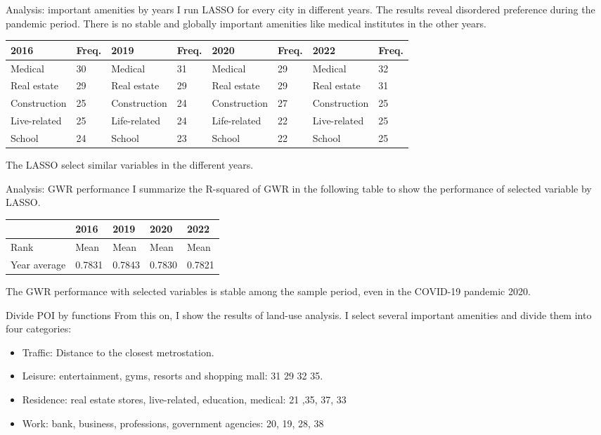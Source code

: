 \documentclass[aspectratio=169,xcolor=dvipsnames]{beamer}
\begin{document}
\begin{frame}{Analysis: important amenities by years}
	I run LASSO for every city in different years.
	The results reveal disordered preference during the pandemic period. There is no stable and globally important amenities like medical institutes in the other years.
	\begin{table}[]\small 
		\begin{tabular}{llllllll}\toprule
			2016         & Freq. & 2019         & Freq. & 2020 & Freq. & 2022         & Freq. \\\hline 
			Medical      & 30        & Medical      & 31        & Medical   & 29        & Medical      & 32        \\
			Real estate  & 29        & Real estate & 29        & Real estate    & 29        & Real estate  & 31        \\
			Construction & 25        & Construction & 24        & Construction   & 27        & Construction & 25        \\
			Live-related & 25        & Life-related  & 24        & Life-related   & 22         & Live-related & 25        \\
			School       & 24        & School       & 23        & School    & 22         & School       & 25       \\\bottomrule
		\end{tabular}
	\end{table}
The LASSO select similar variables in the different years.
\end{frame}
\begin{frame}{Analysis: GWR performance}
	I summarize the R-squared of GWR in the following table to show the performance of selected variable by LASSO.
	\begin{table}[]
		\begin{tabular}{l|llll}
			\hline 
			& 2016   & 2019   & 2020   & 2022   \\
			\midrule 
			Rank & Mean   & Mean   & Mean   & Mean   \\
			\hline 
			Year average&0.7831&0.7843&0.7830&0.7821\\\bottomrule
		\end{tabular}
	\end{table}
The GWR performance with selected variables is stable among the sample period, even in the COVID-19 pandemic 2020.
\end{frame}
\begin{frame}{Divide POI by functions}
	From this on, I show the results of land-use analysis. I select several important amenities and divide them into four categories:
	\begin{itemize}
	\item Traffic: Distance to the closest metrostation.
	\item Leisure: entertainment, gyms, resorts and shopping mall: 31 29 32 35. 
	\item Residence: real estate stores, live-related, education, medical: 21 ,35, 37, 33
	\item Work: bank, business, professions, government agencies: 20, 19, 28, 38
	\end{itemize}
\end{frame}
\end{document}
